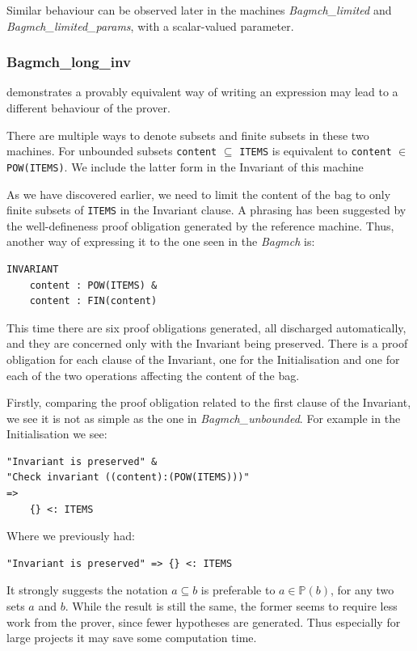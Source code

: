 \documentclass[12pt,journal,duplex]{IEEEtran}
\begin{document}
	Similar behaviour can be observed later in the machines \emph{Bagmch\_limited} and \emph{Bagmch\_limited\_params}, with a scalar-valued parameter.

	\subsubsection{Bagmch\_long\_inv} demonstrates a provably equivalent way of writing an expression may lead to a different behaviour of the prover.

	There are multiple ways to denote subsets and finite subsets in these two machines. For unbounded subsets \texttt{content} $\subseteq$ \texttt{ITEMS} is equivalent to \texttt{content} $\in$ \texttt{POW(ITEMS)}. We include the latter form in the Invariant of this machine

	As we have discovered earlier, we need to limit the content of the bag to only finite subsets of \texttt{ITEMS} in the Invariant clause. A phrasing has been suggested by the well-defineness proof obligation generated by the reference machine. Thus, another way of expressing it to the one seen in the \emph{Bagmch} is:

\begin{lstlisting}
INVARIANT
	content : POW(ITEMS) &
	content : FIN(content)
\end{lstlisting}

	This time there are six proof obligations generated, all discharged automatically, and they are concerned only with the Invariant being preserved. There is a proof obligation for each clause of the Invariant, one for the Initialisation and one for each of the two operations affecting the content of the bag.

	Firstly, comparing the proof obligation related to the first clause of the Invariant, we see it is not as simple as the one in \emph{Bagmch\_unbounded}. For example in the Initialisation we see:

	\begin{lstlisting}
"Invariant is preserved" &
"Check invariant ((content):(POW(ITEMS)))"
=>
	{} <: ITEMS
	\end{lstlisting}

	Where we previously had:
	\begin{lstlisting}
"Invariant is preserved" => {} <: ITEMS
	\end{lstlisting}

	It strongly suggests the notation $a \subseteq b$ is preferable to $a \in \mathbb{P}(b)$, for any two sets $a$ and $b$. While the result is still the same, the former seems to require less work from the prover, since fewer hypotheses are generated. Thus especially for large projects it may save some computation time.
\end{document}
